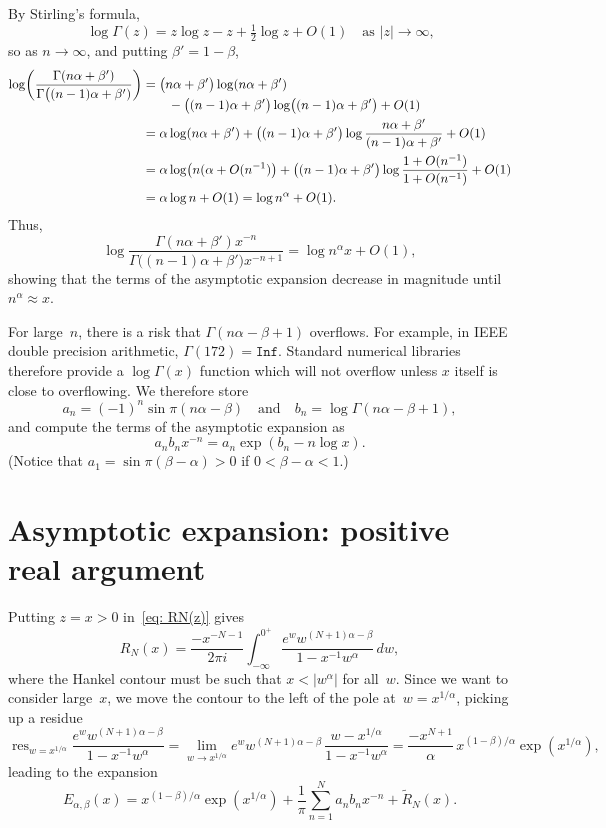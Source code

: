 \documentclass[12pt,a4paper]{article}
\DeclareMathOperator*{\res}{res}
\begin{document}
By Stirling's formula,
\[
\log\Gamma(z)=z\log z-z+\tfrac12\log z+O(1)\quad\text{as $|z|\to\infty$,}
\]
so as $n\to\infty$, and putting $\beta'=1-\beta$,
\begin{align*}
\smash[b]{\log\biggl(\frac{\Gamma(n\alpha+\beta')}%
{\Gamma\bigl((n-1)\alpha+\beta')}\biggr)}&=
\bigl(n\alpha+\beta'\bigr)\log(n\alpha+\beta')\\
&\qquad{}-\bigl((n-1)\alpha+\beta'\bigr)
    \log\bigl((n-1)\alpha+\beta'\bigr)+O(1)\\
    &=\alpha\log(n\alpha+\beta')+\bigl((n-1)\alpha+\beta'\bigr)
    \log\frac{n\alpha+\beta'}{(n-1)\alpha+\beta'}+O(1)\\
    &=\alpha\log\bigl(n(\alpha+O(n^{-1})\bigr)+\bigl((n-1)\alpha+\beta'\bigr)
    \log\frac{1+O(n^{-1})}{1+O(n^{-1})}+O(1)\\
    &=\alpha\log n+O(1)=\log n^\alpha+O(1).
\end{align*}
Thus,
\[
\log\frac{\Gamma(n\alpha+\beta')x^{-n}}%
{\Gamma\bigl((n-1)\alpha+\beta'\bigr)x^{-n+1}}=\log{n^\alpha}{x}+O(1),
\]
showing that the terms of the asymptotic expansion decrease in magnitude until 
$n^\alpha\approx x$.

For large~$n$, there is a risk that $\Gamma(n\alpha-\beta+1)$ overflows.
For example, in IEEE double precision arithmetic, $\Gamma(172)=\mathtt{Inf}$.
Standard numerical libraries therefore provide a $\log\Gamma(x)$ function 
which will not overflow unless $x$ itself is close to overflowing.  We 
therefore store
\[
a_n=(-1)^n\sin\pi(n\alpha-\beta)
\quad\text{and}\quad
b_n=\log\Gamma(n\alpha-\beta+1),
\]
and compute the terms of the asymptotic expansion as
\[
a_nb_nx^{-n}=a_n\exp(b_n-n\log x).
\]
(Notice that $a_1=\sin\pi(\beta-\alpha)>0$ if $0<\beta-\alpha<1$.)

\section{Asymptotic expansion: positive real argument}
Putting $z=x>0$ in~\eqref{eq: RN(z)} gives
\[
R_N(x)=\frac{-x^{-N-1}}{2\pi i}\int_{-\infty}^{0^+}
\frac{e^w w^{(N+1)\alpha-\beta}}{1-x^{-1}w^\alpha}\,dw,
\]
where the Hankel contour must be such that $x<|w^\alpha|$ for all~$w$.
Since we want to consider large~$x$, we move the contour to the left of the 
pole at~$w=x^{1/\alpha}$, picking up a residue
\[
\res_{w=x^{1/\alpha}}\frac{e^w w^{(N+1)\alpha-\beta}}{1-x^{-1}w^\alpha}
    =\lim_{w\to x^{1/\alpha}}e^w w^{(N+1)\alpha-\beta}\,
    \frac{w-x^{1/\alpha}}{1-x^{-1}w^\alpha}
    =\frac{-x^{N+1}}{\alpha}\,x^{(1-\beta)/\alpha}\exp(x^{1/\alpha}),
\]
leading to the expansion
\[
E_{\alpha,\beta}(x)=x^{(1-\beta)/\alpha}\exp(x^{1/\alpha})
    +\frac{1}{\pi}\sum_{n=1}^Na_nb_nx^{-n}+\tilde R_N(x).
\]
\end{document}
